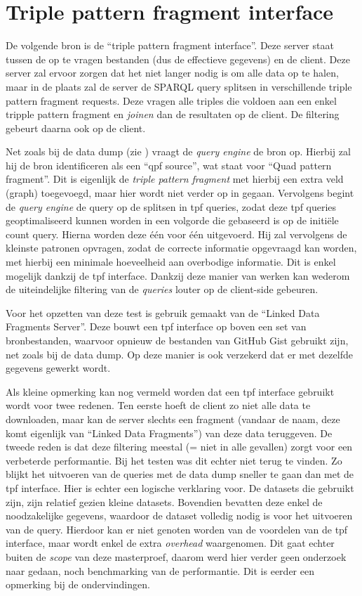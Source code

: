 \section{Triple pattern fragment interface}
\label{sec:impl_tpf_interface}
De volgende bron is de ``triple pattern fragment interface''. Deze server staat tussen de op te vragen bestanden (dus de effectieve gegevens) en de client. Deze server zal ervoor zorgen dat het niet langer nodig is om alle data op te halen, maar in de plaats zal de server de SPARQL query splitsen in verschillende triple pattern fragment requests. Deze vragen alle triples die voldoen aan een enkel tripple pattern fragment en \textit{joinen} dan de resultaten op de client. De filtering gebeurt daarna ook op de client.

Net zoals bij de data dump (zie ) vraagt de \textit{query engine} de bron op. Hierbij zal hij de bron identificeren als een ``qpf source'', wat staat voor ``Quad pattern fragment''. Dit is eigenlijk de \textit{triple pattern fragment} met hierbij een extra veld (graph) toegevoegd, maar hier wordt niet verder op in gegaan. Vervolgens begint de \textit{query engine} de query op de splitsen in \acrfull{tpf} queries, zodat deze \acrshort{tpf} queries geoptimaliseerd kunnen worden in een volgorde die gebaseerd is op de initiële count query. Hierna worden deze één voor één uitgevoerd. Hij zal vervolgens de kleinste patronen opvragen, zodat de correcte informatie opgevraagd kan worden, met hierbij een minimale hoeveelheid aan overbodige informatie. Dit is enkel mogelijk dankzij de \acrshort{tpf} interface. Dankzij deze manier van werken kan wederom de uiteindelijke filtering van de \textit{queries} louter op de client-side gebeuren.

Voor het opzetten van deze test is gebruik gemaakt van de ``Linked Data Fragments Server''. Deze bouwt een \acrshort{tpf} interface op boven een set van bronbestanden, waarvoor opnieuw de bestanden van GitHub Gist gebruikt zijn, net zoals bij de data dump. Op deze manier is ook verzekerd dat er met dezelfde gegevens gewerkt wordt. 

Als kleine opmerking kan nog vermeld worden dat een \acrshort{tpf} interface gebruikt wordt voor twee redenen. Ten eerste hoeft de client zo niet alle data te downloaden, maar kan de server slechts een fragment (vandaar de naam, deze komt eigenlijk van ``Linked Data Fragments'') van deze data teruggeven. De tweede reden is dat deze filtering meestal (= niet in alle gevallen) zorgt voor een verbeterde performantie. Bij het testen was dit echter niet terug te vinden. Zo blijkt het uitvoeren van de queries met de data dump sneller te gaan dan met de \acrshort{tpf} interface. Hier is echter een logische verklaring voor. De datasets die gebruikt zijn, zijn relatief gezien kleine datasets. Bovendien bevatten deze enkel de noodzakelijke gegevens, waardoor de dataset volledig nodig is voor het uitvoeren van de query. Hierdoor kan er niet genoten worden van de voordelen van de \acrshort{tpf} interface, maar wordt enkel de extra \textit{overhead} waargenomen. Dit gaat echter buiten de \textit{scope} van deze masterproef, daarom werd hier verder geen onderzoek naar gedaan, noch benchmarking van de performantie. Dit is eerder een opmerking bij de ondervindingen.